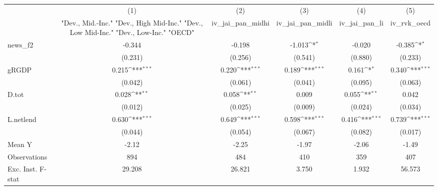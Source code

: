 {
\def\sym#1{\ifmmode^{#1}\else\(^{#1}\)\fi}
\begin{tabular}{l*{5}{c}}
\toprule
            &\multicolumn{1}{c}{(1)}&\multicolumn{1}{c}{(2)}&\multicolumn{1}{c}{(3)}&\multicolumn{1}{c}{(4)}&\multicolumn{1}{c}{(5)}\\
            &\multicolumn{1}{c}{ "Dev., Mid.-Inc." "Dev., High Mid-Inc." "Dev., Low Mid-Inc." "Dev., Low-Inc." "OECD" }&\multicolumn{1}{c}{iv\_jai\_pan\_midhi}&\multicolumn{1}{c}{iv\_jai\_pan\_midli}&\multicolumn{1}{c}{iv\_jai\_pan\_li}&\multicolumn{1}{c}{iv\_rvk\_oecd}\\
\midrule
news\_f2     &      -0.344         &      -0.198         &      -1.013\sym{*}  &      -0.020         &      -0.385\sym{*}  \\
            &     (0.231)         &     (0.256)         &     (0.541)         &     (0.880)         &     (0.233)         \\
\addlinespace
gRGDP       &       0.215\sym{***}&       0.220\sym{***}&       0.189\sym{***}&       0.161\sym{*}  &       0.340\sym{***}\\
            &     (0.042)         &     (0.061)         &     (0.041)         &     (0.095)         &     (0.063)         \\
\addlinespace
D.tot       &       0.028\sym{**} &       0.058\sym{**} &       0.009         &       0.055\sym{**} &       0.042         \\
            &     (0.012)         &     (0.025)         &     (0.009)         &     (0.024)         &     (0.034)         \\
\addlinespace
L.netlend   &       0.630\sym{***}&       0.649\sym{***}&       0.598\sym{***}&       0.416\sym{***}&       0.739\sym{***}\\
            &     (0.044)         &     (0.054)         &     (0.067)         &     (0.082)         &     (0.017)         \\
\midrule
Mean Y      &       -2.12         &       -2.25         &       -1.97         &       -2.06         &       -1.49         \\
Observations&         894         &         484         &         410         &         359         &         407         \\
Exc. Inst. F-stat&      29.208         &      26.821         &       3.750         &       1.932         &      56.573         \\
\bottomrule
\end{tabular}
}
